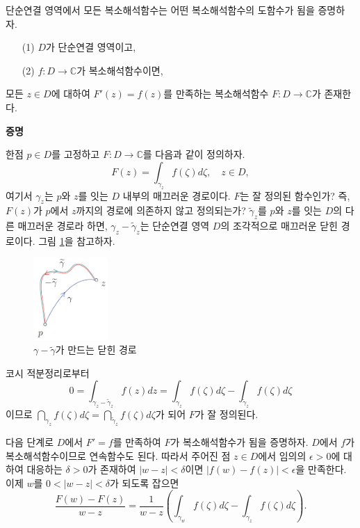 단순연결 영역에서 모든 복소해석함수는 어떤 복소해석함수의 도함수가 됨을 증명하자.

\begin{salttheorem} {}{} \label{thm-3-5}

\begin{itemize}
\item[(1)] $D$가 단순연결 영역이고,
\item[(2)] $f:D\to\mathbb C$가 복소해석함수이면,
\end{itemize}
모든 $z\in D$에 대하여 $F'(z) = f(z)$를 만족하는 
복소해석함수 $F:D\to\mathbb C$가 존재한다.
\end{salttheorem}

{\bf 증명}

한점 $p\in D$를 고정하고 $F:D\to\mathbb C$를 다음과 같이 정의하자.
\[
F(z) = \int_{\gamma_z} f(\zeta)d\zeta, \quad z\in D,
\]
여기서 $\gamma_z$는 $p$와 $z$를 잇는 $D$ 내부의 매끄러운 경로이다.
$F$는 잘 정의된 함수인가? 즉, $F(z)$가 $p$에서 $z$까지의 경로에
의존하지 않고 정의되는가?
$\tilde \gamma_z$를 $p$와 $z$를 잇는 $D$의 다른 매끄러운 경로라 하면,
$\gamma_z - \tilde\gamma_z$는 단순연결 영역 $D$의
조각적으로 매끄러운 닫힌 경로이다. 그림 \ref{fig-3-16}을 참고하자.

\begin{figure}[!h]
\begin{center}
\includegraphics[width=0.25\textwidth]{./SaltChapter/figs/fig-3-16}
\end{center}
\caption{$\gamma - \tilde \gamma$가 만드는 닫힌 경로}
\label{fig-3-16}
\end{figure}

코시 적분정리로부터 
\[
0 = \int_{\gamma_z - \tilde\gamma_z}f(z)dz 
= \int_{\gamma_z} f(\zeta)d\zeta 
- \int_{\tilde\gamma_z} f(\zeta)d\zeta 
\]
이므로 $\dint_{\gamma_z}f(\zeta)d\zeta = \dint_{\tilde\gamma_z} f(\zeta)d\zeta$가 되어 
$F$가 잘 정의된다.

다음 단계로 $D$에서 $F'=f$를 만족하여 $F$가 복소해석함수가 됨을 증명하자.
$D$에서 $f$가 복소해석함수이므로
연속함수도 된다. 
따라서 주어진 점 $z\in D$에서 임의의 $\epsilon>0$에 대하여
대응하는 $\delta>0$가 존재하여
$|w-z|<\delta$이면 $|f(w)-f(z)|<\epsilon$을 만족한다.
이제 $w$를 $0<|w-z|<\delta$가 되도록 잡으면
\[
\dfrac{F(w)-F(z)}{w-z} = \dfrac1{w-z} \left(
\int_{\gamma_w} f(\zeta)d\zeta - \int_{\gamma_z} f(\zeta)d\zeta \right).
\]

